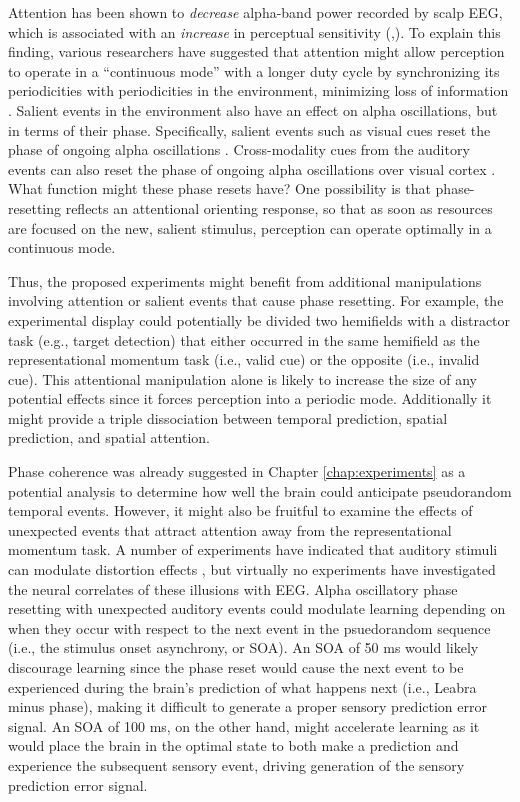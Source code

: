 \documentclass[defaultstyle,12pt]{thesis}
\begin{document}
{Attention has been shown to \textit{decrease} alpha-band power recorded by scalp EEG, which is associated with an \textit{increase} in perceptual sensitivity (,). To explain this finding, various researchers have suggested that attention might allow perception to operate in a ``continuous mode'' with a longer duty cycle by synchronizing its periodicities with periodicities in the environment, minimizing loss of information \cite{SchroederLakatos09,JensenBonnefondVanRullen12}. Salient events in the environment also have an effect on alpha oscillations, but in terms of their phase. Specifically, salient events such as visual cues reset the phase of ongoing alpha oscillations \cite{LandauFries12}. Cross-modality cues from the auditory events can also reset the phase of ongoing alpha oscillations over visual cortex \cite{RomeiGrossThut12}. What function might these phase resets have? One possibility is that phase-resetting reflects an attentional orienting response, so that as soon as resources are focused on the new, salient stimulus, perception can operate optimally in a continuous mode. 

Thus, the proposed experiments might benefit from additional manipulations involving attention or salient events that cause phase resetting. For example, the experimental display could potentially be divided two hemifields with a distractor task (e.g., target detection) that either occurred in the same hemifield as the representational momentum task (i.e., valid cue) or the opposite (i.e., invalid cue). This attentional manipulation alone is likely to increase the size of any potential effects since it forces perception into a periodic mode. Additionally it might provide a triple dissociation between temporal prediction, spatial prediction, and spatial attention.

Phase coherence was already suggested in Chapter \ref{chap:experiments} as a potential analysis to determine how well the brain could anticipate pseudorandom temporal events. However, it might also be fruitful to examine the effects of unexpected events that attract attention away from the representational momentum task. A number of experiments have indicated that auditory stimuli can modulate distortion effects \cite{ShamsKamitaniShimojo02,TeramotoHidakaGyobaEtAl10,ChienOnoWatanabe13}, but virtually no experiments have investigated the neural correlates of these illusions with EEG. Alpha oscillatory phase resetting with unexpected auditory events could modulate learning depending on when they occur with respect to the next event in the psuedorandom sequence (i.e., the stimulus onset asynchrony, or SOA). An SOA of 50 ms would likely discourage learning since the phase reset would cause the next event to be experienced during the brain's prediction of what happens next (i.e., Leabra minus phase), making it difficult to generate a proper sensory prediction error signal. An SOA of 100 ms, on the other hand, might accelerate learning as it would place the brain in the optimal state to both make a prediction and experience the subsequent sensory event, driving generation of the sensory prediction error signal.

}
\end{document}
